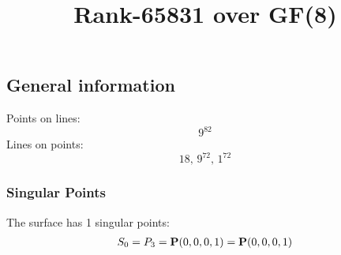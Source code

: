 \documentclass{article}
\newcommand\setTBstruts{\def\T{\rule{0pt}{2.6ex}}%
\def\B{\rule[-1.2ex]{0pt}{0pt}}}
\newcommand{\bP}{{\bf P}}
\begin{document}
 
\setTBstruts



{\allowdisplaybreaks%






\title{Rank-65831 over GF(8)}
\author{}%
\maketitle%
%
{}



\subsection*{General information}
Points on lines:
$$
9^{82}$$
Lines on points:
$$
18,\,9^{72},\,1^{72}$$
\subsubsection*{Singular Points}
The surface has 1 singular points:\\
\begin{align*}
S_{0} &= P_{3}=\bP(0, 0, 0, 1) = \bP(0, 0, 0, 1)\\
\end{align*}
}
\end{document}
